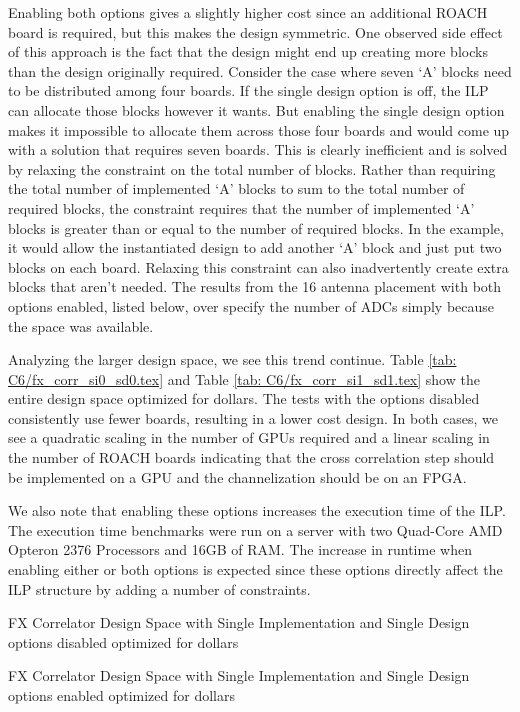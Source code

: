 
  
Enabling both options gives a slightly higher cost since an additional ROACH board is required, but this makes the design symmetric.
One observed side effect of this approach is the fact that the design might end up creating more blocks than the design originally required.
Consider the case where seven `A' blocks need to be distributed among four boards. 
If the single design option is off, the ILP can allocate those blocks however it wants.
But enabling the single design option makes it impossible to allocate them across those four boards and would come up with a solution that requires seven boards.
This is clearly inefficient and is solved by relaxing the constraint on the total number of blocks.
Rather than requiring the total number of implemented `A' blocks to sum to the total number of required blocks, the constraint requires that the number of implemented `A' blocks is greater than or equal to the number of required blocks.
In the example, it would allow the instantiated design to add another `A' block and just put two blocks on each board.
Relaxing this constraint can also inadvertently create extra blocks that aren't needed.
The results from the 16 antenna placement with both options enabled, listed below, over specify the number of ADCs simply because the space was available.
  
  
  
Analyzing the larger design space, we see this trend continue. 
Table \ref{tab: C6/fx_corr_si0_sd0.tex} and Table \ref{tab: C6/fx_corr_si1_sd1.tex} show the entire design space optimized for dollars.
The tests with the options disabled consistently use fewer boards, resulting in a lower cost design.
In both cases, we see a quadratic scaling in the number of GPUs required and a linear scaling in the number of ROACH boards indicating that the cross correlation step should be implemented on a GPU and the channelization should be on an FPGA.

We also note that enabling these options increases the execution time of the ILP.
The execution time benchmarks were run on a server with two Quad-Core AMD Opteron 2376 Processors and 16GB of RAM.
The increase in runtime when enabling either or both options is expected since these options directly affect the ILP structure by adding a number of constraints.



\begin{table}
\centering

\caption{FX Correlator Design Space with Single Implementation and Single Design options disabled optimized for dollars}
\label{tab: C6/fx_corr_si0_sd0.tex}


\caption{FX Correlator Design Space with Single Implementation and Single Design options enabled optimized for dollars}
\label{tab: C6/fx_corr_si1_sd1.tex}
\end{table} 

